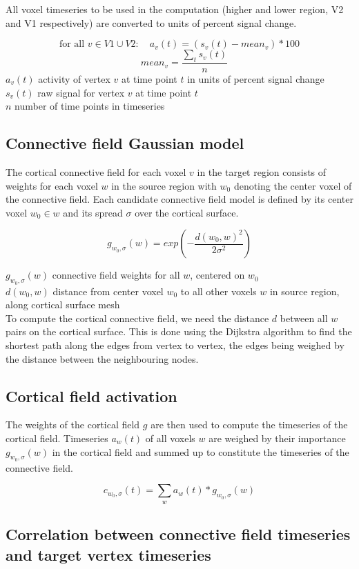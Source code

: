 \documentclass[biblatex]{lni}
\begin{document}
All voxel timeseries to be used in the computation (higher and lower region, V2 and V1 respectively) are converted to units of percent signal change.

\[\textrm{for all } v \in V1 \cup V2:\quad a_v(t)=(s_v(t)-mean_v)*100\] 
\[\quad mean_v=\frac{\sum_{t} s_v(t)}{ n}\]
$a_v(t)$ activity of vertex $v$ at time point $t$ in units of percent signal change \\
$s_v(t)$ raw signal for vertex $v$ at time point $t$ \\
$n$ number of time points in timeseries\\

\subsection{Connective field Gaussian model}
The cortical connective field for each voxel $v$ in the target region consists of weights for each voxel $w$ in the source region with $w_0$ denoting the center voxel of the connective field. Each candidate connective field model is defined by its center voxel $w_0 \in {w}$ and its spread $\sigma$ over the cortical surface.

\[g_{w_0,\sigma}(w)=exp(-\frac{d(w_0,w)^2}{2\sigma^2})\]

$g_{w_0,\sigma}(w)$ connective field weights for all $w$, centered on $w_0$  \\
$d(w_0,w)$ distance from center voxel $w_0$ to all other voxels $w$ in source region, along cortical surface mesh\\

To compute the cortical connective field, we need the distance $d$ between all $w$ pairs on the cortical surface. This is done using the Dijkstra algorithm to find the shortest path along the edges from vertex to vertex, the edges being weighed by the distance between the neighbouring nodes. 

\subsection{Cortical field activation}
The weights of the cortical field $g$ are then used to compute the timeseries of the cortical field. Timeseries $a_w(t)$ of all voxels $w$ are weighed by their importance $g_{w_0,\sigma}(w)$ in the cortical field and summed up to constitute the timeseries of the connective field.

\[c_{w_0,\sigma}(t)=\sum_{w} a_w(t)*g_{w_0,\sigma}(w)\]

\subsection{Correlation between connective field timeseries and target vertex timeseries}
\end{document}
